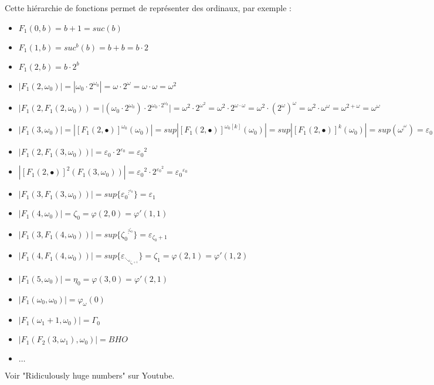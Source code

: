 \documentclass[12pt]{beamer}
\begin{document}
\begin{frame}

Cette hiérarchie de fonctions permet de représenter des ordinaux, par exemple :

\begin{itemize}
     \setlength{\itemsep}{1pt}
     \setlength{\parskip}{0pt}
     \setlength{\parsep}{0pt}
\item \( F_1(0,b) = b+1 = suc(b) \)
\item \( F_1(1,b) = suc^b(b) = b+b = b \cdot 2\)
\item \( F_1(2,b) = b \cdot 2^b \)
\item \( |F_1(2,\omega_0)| = |\omega_0 \cdot 2^{\omega_0}| = \omega \cdot 2^\omega = \omega \cdot \omega = \omega^2 \)
\item \( |F_1(2,F_1(2,\omega_0)) = |(\omega_0 \cdot 2^{\omega_0}) \cdot 2^{\omega_0 \cdot 2^{\omega_0}}| = \omega^2 \cdot 2^{\omega^2} = \omega^2 \cdot 2^{\omega \cdot \omega} = \omega^2 \cdot (2^\omega)^\omega = \omega^2 \cdot \omega^\omega = \omega^{2+\omega} = \omega^\omega \) 
\item \( |F_1(3,\omega_0)| = |[F_1(2,\bullet)]^{\omega_0}(\omega_0)| = sup |[F_1(2,\bullet)]^{\omega_0[k]}(\omega_0)| = sup |[F_1(2,\bullet)]^k(\omega_0)| = sup (\omega^{\vdots^\omega}) = \varepsilon_0 \)
\item \( |F_1(2,F_1(3,\omega_0))| = \varepsilon_0 \cdot 2^{\varepsilon_0} = {\varepsilon_0}^2 \)
\item \( |[F_1(2,\bullet)]^2(F_1(3,\omega_0))| = {\varepsilon_0}^2 \cdot 2^{{\varepsilon_0}^2} = {\varepsilon_0}^{\varepsilon_0} \)
\item \( |F_1(3,F_1(3,\omega_0))| = sup \lbrace {\varepsilon_0}^{\vdots^{\varepsilon_0}} \rbrace = \varepsilon_1 \)
\end{itemize}

\end{frame}
\begin{frame}

\begin{itemize}
     \setlength{\itemsep}{1pt}
     \setlength{\parskip}{0pt}
     \setlength{\parsep}{0pt}
\item \( |F_1(4,\omega_0)| = \zeta_0 = \varphi(2,0) = \varphi'(1,1) \)
\item \( |F_1(3,F_1(4,\omega_0))| = sup \lbrace {\zeta_0}^{\vdots^{\zeta_0}} \rbrace = \varepsilon_{\zeta_0+1} \)
\item \( |F_1(4,F_1(4,\omega_0))| = sup \lbrace \varepsilon_{\ddots_{\varepsilon_{\zeta_0+1}}} \rbrace = \zeta_1 = \varphi(2,1) = \varphi'(1,2) \)
\item \( |F_1(5,\omega_0)| = \eta_0 = \varphi(3,0) = \varphi'(2,1) \)
\item \( |F_1(\omega_0,\omega_0)| = \varphi_\omega(0) \)
\item \( |F_1(\omega_1+1,\omega_0)| = \Gamma_0 \)
\item \( |F_1(F_2(3,\omega_1),\omega_0)| = BHO \)

\item \( \ldots \)
\end{itemize}

Voir "Ridiculously huge numbers" sur Youtube.

\end{frame}
\end{document}

